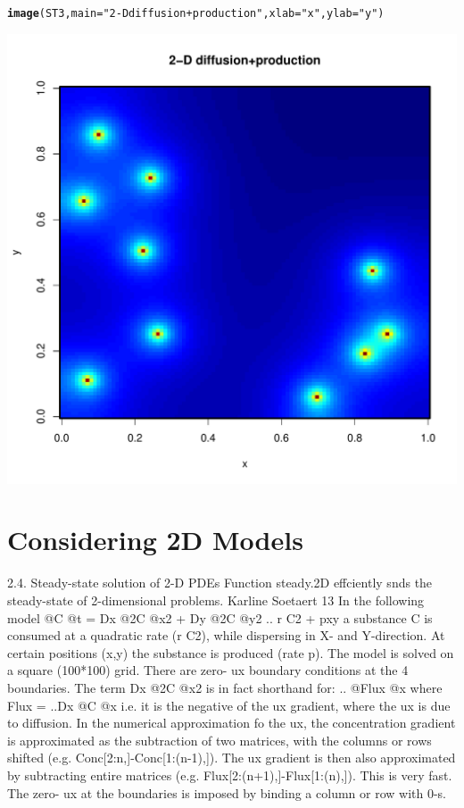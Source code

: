 \documentclass{tufte-handout}\usepackage[]{graphicx}\usepackage[]{xcolor}
\makeatletter
\def\maxwidth{ %
  \ifdim\Gin@nat@width>\linewidth
    \linewidth
  \else
    \Gin@nat@width
  \fi
}
\newcommand{\hlstr}[1]{\textcolor[rgb]{0.192,0.494,0.8}{#1}}%
\newcommand{\hlstd}[1]{\textcolor[rgb]{0.345,0.345,0.345}{#1}}%
\newcommand{\hlkwc}[1]{\textcolor[rgb]{0.333,0.667,0.333}{#1}}%
\newcommand{\hlkwd}[1]{\textcolor[rgb]{0.737,0.353,0.396}{\textbf{#1}}}%
\newenvironment{kframe}{%
 \def\at@end@of@kframe{}%
 \ifinner\ifhmode%
  \def\at@end@of@kframe{\end{minipage}}%
  \begin{minipage}{\columnwidth}%
 \fi\fi%
 \def\FrameCommand##1{\hskip\@totalleftmargin \hskip-\fboxsep
 \colorbox{shadecolor}{##1}\hskip-\fboxsep
     \hskip-\linewidth \hskip-\@totalleftmargin \hskip\columnwidth}%
 \MakeFramed {\advance\hsize-\width
   \@totalleftmargin\z@ \linewidth\hsize
   \@setminipage}}%
 {\par\unskip\endMakeFramed%
 \at@end@of@kframe}
\newenvironment{knitrout}{}{} %
\makeatother
\begin{document}
\begin{knitrout}
\color{fgcolor}\begin{kframe}
\begin{alltt}
\hlkwd{image}\hlstd{(ST3,}\hlkwc{main}\hlstd{=}\hlstr{"2-D diffusion+production"}\hlstd{,} \hlkwc{xlab}\hlstd{=}\hlstr{"x"}\hlstd{,} \hlkwc{ylab}\hlstd{=}\hlstr{"y"}\hlstd{)}
\end{alltt}
\end{kframe}
\includegraphics[width=\maxwidth]{figure/unnamed-chunk-15-1} 
\end{knitrout}


\section{Considering 2D Models}

2.4. Steady-state solution of 2-D PDEs
Function steady.2D effciently snds the steady-state of 2-dimensional problems.
Karline Soetaert 13
In the following model
@C
@t
= Dx 
@2C
@x2 + Dy 
@2C
@y2
.. r  C2 + pxy
a substance C is consumed at a quadratic rate (r C2), while dispersing in X- and Y-direction.
At certain positions (x,y) the substance is produced (rate p).
The model is solved on a square (100*100) grid. There are zero-
ux boundary conditions at
the 4 boundaries.
The term Dx  @2C
@x2 is in fact shorthand for:
..
@Flux
@x
where
Flux = ..Dx 
@C
@x
i.e. it is the negative of the 
ux gradient, where the 
ux is due to diffusion.
In the numerical approximation fo the 
ux, the concentration gradient is approximated as the
subtraction of two matrices, with the columns or rows shifted (e.g. Conc[2:n,]-Conc[1:(n-1),]).
The 
ux gradient is then also approximated by subtracting entire matrices
(e.g. Flux[2:(n+1),]-Flux[1:(n),]). This is very fast. The zero-
ux at the boundaries is
imposed by binding a column or row with 0-s.
\end{document}

